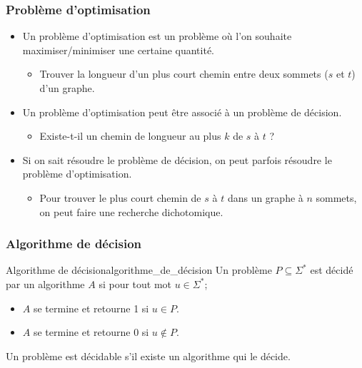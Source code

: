 \subsubsection{Problème d'optimisation}
\label{sub:probleme_d_optimisation}
\begin{itemize}[label=\textbullet]
    \item Un problème d'optimisation est un problème où l'on souhaite maximiser/minimiser une certaine quantité.
    \begin{itemize}[label=$\rightarrow$]
        \item Trouver la longueur d'un plus court chemin entre deux sommets ($s$ et $t$) d'un graphe.
    \end{itemize}
    \item Un problème d'optimisation peut être associé à un problème de décision.
    \begin{itemize}[label=$\rightarrow$]
        \item Existe-t-il un chemin de longueur au plus $k$ de $s$ à $t$ ?
    \end{itemize}
    \item Si on sait résoudre le problème de décision, on peut parfois résoudre le problème d'optimisation.
    \begin{itemize}[label=$\rightarrow$]
        \item Pour trouver le plus court chemin de $s$ à $t$ dans un graphe à $n$ sommets, on peut faire une recherche
        dichotomique.
    \end{itemize}
\end{itemize}

\subsubsection{Algorithme de décision}
\label{sub:algorithme_de_decision}
\begin{definition}{Algorithme de décision}{algorithme_de_décision}
    Un problème $P\subseteq\Sigma^*$ est décidé par un algorithme $A$ si pour tout mot $u\in\Sigma^*$;
    \begin{itemize}[label=\textbullet]
        \item $A$ se termine et retourne 1 si $u\in P$.
        \item $A$ se termine et retourne 0 si $u\notin P$.
    \end{itemize}
    Un problème est décidable s'il existe un algorithme qui le décide.
\end{definition}

